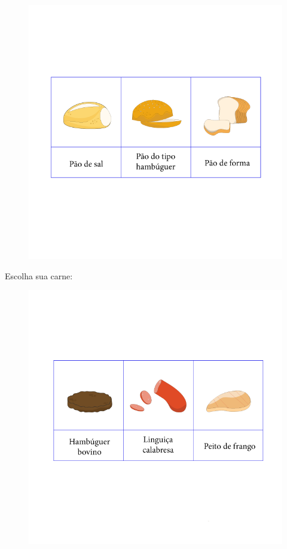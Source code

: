 \begin{figure}[htpb!]
\includegraphics[width=\textwidth]{../ilustracoes/MAT5/SAEB_5ANO_MAT_figura81a.png}
\end{figure}

Escolha sua carne:

\begin{figure}[htpb!]
\includegraphics[width=\textwidth]{../ilustracoes/MAT5/SAEB_5ANO_MAT_figura81b.png}
\end{figure}

